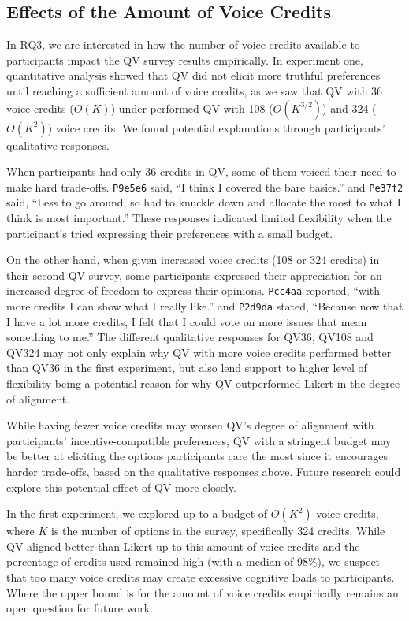 \subsection{Effects of the Amount of Voice Credits}
In RQ3, we are interested in how the number of voice credits available to participants impact the QV survey results empirically. In experiment one, quantitative analysis showed that QV did not elicit more truthful preferences until reaching a sufficient amount of voice credits, as we saw that QV with 36 voice credits ($O(K)$) under-performed QV with 108 ($O(K^{3/2})$) and 324 ($O(K^{2})$) voice credits. We found potential explanations through participants' qualitative responses. 

When participants had only 36 credits in QV, some of them voiced their need to make hard trade-offs. \texttt{P9e5e6} said, ``I think I covered the bare basics.'' and \texttt{Pe37f2} said, ``Less to go around, so had to knuckle down and allocate the most to what I think is most important.'' These responses indicated limited flexibility when the participant's tried expressing their preferences with a small budget.

On the other hand, when given increased voice credits (108 or 324 credits) in their second QV survey, some participants expressed their appreciation for an increased degree of freedom to express their opinions. \texttt{Pcc4aa} reported, ``with more credits I can show what I really like.'' and \texttt{P2d9da} stated, ``Because now that I have a lot more credits, I felt that I could vote on more issues that mean something to me.'' The different qualitative responses for QV36, QV108 and QV324 may not only explain why QV with more voice credits performed better than QV36 in the first experiment, but also lend support to higher level of flexibility being a potential reason for why QV outperformed Likert in the degree of alignment. 

While having fewer voice credits may worsen QV's degree of alignment with participants' incentive-compatible preferences, QV with a stringent budget may be better at eliciting the options participants care the most since it encourages harder trade-offs, based on the qualitative responses above. Future research could explore this potential effect of QV more closely.

In the first experiment, we explored up to a budget of $O(K^{2})$ voice credits, where $K$ is the number of options in the survey, specifically 324 credits. While QV aligned better than Likert up to this amount of voice credits and the percentage of credits used remained high (with a median of 98\%), we suspect that too many voice credits may create excessive cognitive loads to participants. Where the upper bound is for the amount of voice credits empirically remains an open question for future work.


